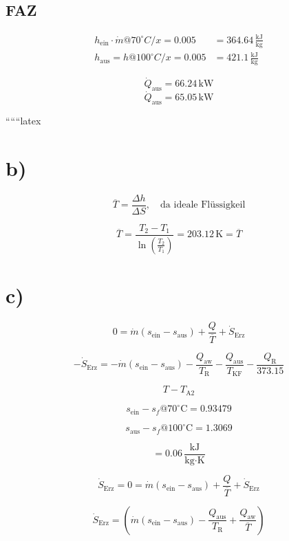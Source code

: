 \subsection*{FAZ}
\begin{align*}
h_{\text{ein}} \cdot \dot{m} @ 70^\circ C / x = 0.005 &= 364.64 \, \frac{\text{kJ}}{\text{kg}} \\
h_{\text{aus}} = h @ 100^\circ C / x = 0.005 &= 421.1 \, \frac{\text{kJ}}{\text{kg}}
\end{align*}

\begin{equation}
\dot{Q}_{\text{aus}} = 66.24 \, \text{kW}
\end{equation}
\begin{equation}
\dot{Q}_{\text{aus}} = 65.05 \, \text{kW}
\end{equation}

``````latex

\section*{b)}

\[
\overline{T} = \frac{\Delta h}{\Delta S}, \quad \text{da ideale Flüssigkeil}
\]

\[
\overline{T} = \frac{T_2 - T_1}{\ln \left( \frac{T_2}{T_1} \right)} = \boxed{203.12 \, \text{K} = \overline{T}}
\]

\section*{c)}

\[
0 = \dot{m} (s_{\text{ein}} - s_{\text{aus}}) + \frac{Q}{\overline{T}} + \dot{S}_{\text{Erz}}
\]

\[
-\dot{S}_{\text{Erz}} = -\dot{m} (s_{\text{ein}} - s_{\text{aus}}) - \frac{Q_{\text{aw}}}{T_{\text{R}}} - \frac{Q_{\text{aus}}}{T_{\text{KF}}} - \frac{Q_{\text{R}}}{373.15}
\]

\[
T - T_{\text{A2}}
\]

\[
s_{\text{ein}} - s_f @ 70^\circ \text{C} = 0.93479
\]

\[
s_{\text{aus}} - s_f @ 100^\circ \text{C} = 1.3069
\]

\[
= 0.06 \, \frac{\text{kJ}}{\text{kg} \cdot \text{K}}
\]

\[
\dot{S}_{\text{Erz}} = 0 = \dot{m} (s_{\text{ein}} - s_{\text{aus}}) + \frac{Q}{\overline{T}} + \dot{S}_{\text{Erz}}
\]

\[
\dot{S}_{\text{Erz}} = \left( \dot{m} (s_{\text{ein}} - s_{\text{aus}}) - \frac{Q_{\text{aus}}}{T_{\text{R}}} + \frac{Q_{\text{aw}}}{\overline{T}} \right)
\]

